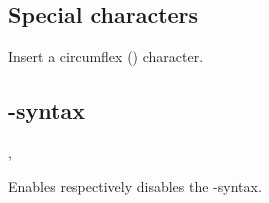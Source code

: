 \documentclass[11pt, cm-default]{l3doc}
\begin{document}
	\subsection{Special characters}
	\begin{function}[updated=v1.4.0]{\cir}
		\begin{syntax}
		\end{syntax}
		Insert a circumflex (\cir) character.
	\end{function}



	\subsection{-syntax}
	\begin{function}{\enableeasyformat, \disableeasyformat}
		\begin{syntax}
		\end{syntax}
		Enables respectively disables the -syntax.
	\end{function}
	

\end{document}
